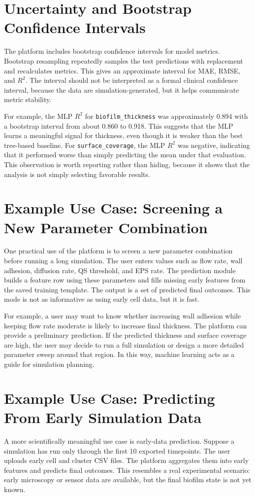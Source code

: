 \documentclass[12pt,a4paper,oneside]{report}
\begin{document}
\section{Uncertainty and Bootstrap Confidence Intervals}
The platform includes bootstrap confidence intervals for model metrics. Bootstrap resampling repeatedly samples the test predictions with replacement and recalculates metrics. This gives an approximate interval for MAE, RMSE, and \(R^2\). The interval should not be interpreted as a formal clinical confidence interval, because the data are simulation-generated, but it helps communicate metric stability.

For example, the MLP \(R^2\) for \texttt{biofilm\_thickness} was approximately 0.894 with a bootstrap interval from about 0.860 to 0.918. This suggests that the MLP learns a meaningful signal for thickness, even though it is weaker than the best tree-based baseline. For \texttt{surface\_coverage}, the MLP \(R^2\) was negative, indicating that it performed worse than simply predicting the mean under that evaluation. This observation is worth reporting rather than hiding, because it shows that the analysis is not simply selecting favorable results.


\section{Example Use Case: Screening a New Parameter Combination}
One practical use of the platform is to screen a new parameter combination before running a long simulation. The user enters values such as flow rate, wall adhesion, diffusion rate, QS threshold, and EPS rate. The prediction module builds a feature row using these parameters and fills missing early features from the saved training template. The output is a set of predicted final outcomes. This mode is not as informative as using early cell data, but it is fast.

For example, a user may want to know whether increasing wall adhesion while keeping flow rate moderate is likely to increase final thickness. The platform can provide a preliminary prediction. If the predicted thickness and surface coverage are high, the user may decide to run a full simulation or design a more detailed parameter sweep around that region. In this way, machine learning acts as a guide for simulation planning.

\section{Example Use Case: Predicting From Early Simulation Data}
A more scientifically meaningful use case is early-data prediction. Suppose a simulation has run only through the first 10 exported timepoints. The user uploads early cell and cluster CSV files. The platform aggregates them into early features and predicts final outcomes. This resembles a real experimental scenario: early microscopy or sensor data are available, but the final biofilm state is not yet known.
\end{document}
